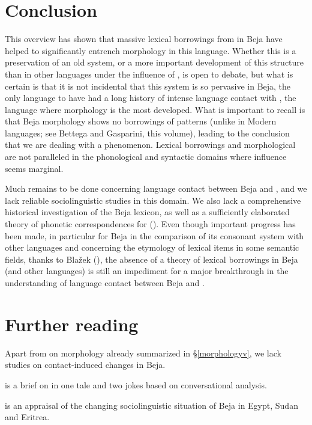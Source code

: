 \documentclass[output=paper]{langsci/langscibook}
\begin{document}
\section{Conclusion}

This overview has shown that massive lexical borrowings from  in Beja have helped to significantly entrench  morphology in this language. Whether this is a preservation of an old  system, or a more important development of this structure than in other  languages under the influence of , is open to debate, but what is certain is that it is not incidental that this system is so pervasive in Beja, the only  language to have had a long history of intense language contact with , the  language where  morphology is the most developed. What is important to recall is that Beja  morphology shows no borrowings of  patterns (unlike in Modern  languages; see Bettega and Gasparini, this volume), leading to the conclusion that we are dealing with a  phenomenon. Lexical borrowings and morphological  are not paralleled in the phonological and syntactic domains where  influence seems marginal.

Much remains to be done concerning language contact between Beja and , and we lack reliable sociolinguistic studies in this domain. We also lack a comprehensive historical investigation of the Beja lexicon, as well as a sufficiently elaborated theory of phonetic correspondences for  (\citeyear[267]{Cohen1988}). Even though important progress has been made, in particular for Beja in the comparison of its consonant system with other  languages and concerning the etymology of lexical items in some semantic fields, thanks to Blažek (\citeyear{Blažek2000,Blažek2003kinship,Blažek2003fauna,Blažek2006BB2,Blažek2006BB3}), the absence of a theory of lexical borrowings in Beja (and other  languages) is still an impediment for a major breakthrough in the understanding of language contact between Beja and .

\section*{Further reading}
\begin{furtherreading}
\item Apart from \citet{Vanhove2012} on  morphology already summarized in §\ref{morphologyv}, we lack studies on contact-induced changes in Beja. 
\item \citet{Vanhove2003} is a brief  on  in one tale and two jokes based on conversational analysis. 
\item \citet{Wedekind2012} is an appraisal of the changing sociolinguistic situation of Beja in Egypt, Sudan and Eritrea.
\end{furtherreading}
\end{document}
